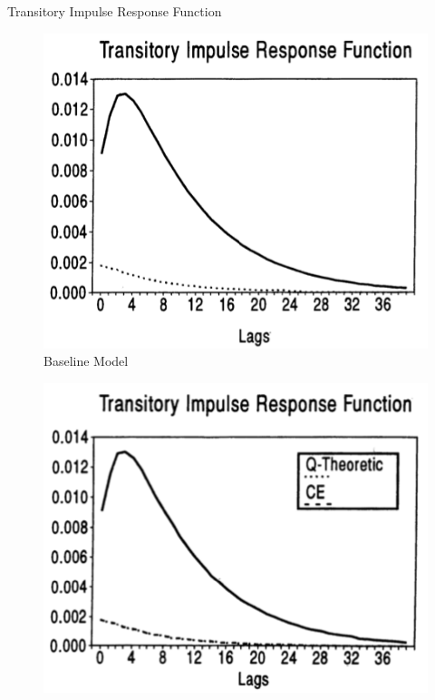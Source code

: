 \documentclass[10pt]{beamer}
\begin{document}
\begin{frame}{Transitory Impulse Response Function}  
\begin{minipage}{0.33\textwidth}
\begin{figure}
  \centering
  \includegraphics[width=\linewidth]{Base_trans_IRF.png}
  \caption{Baseline Model}
\end{figure}
\end{minipage}%
\begin{minipage}{0.33\textwidth}
\begin{figure}
  \centering
  \includegraphics[width=\linewidth]{K_trans_IRF.png}

\end{figure}
\end{minipage}
\end{frame}
\end{document}
